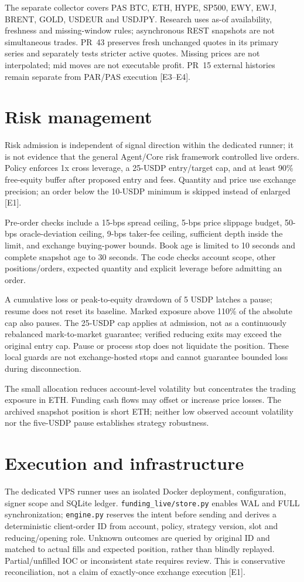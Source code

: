 \documentclass[a4paper]{article}
\begin{document}
The separate collector covers PAS BTC, ETH, HYPE, SP500, EWY, EWJ, BRENT, GOLD, USDEUR and USDJPY. Research uses as-of availability, freshness and missing-window rules; asynchronous REST snapshots are not simultaneous trades. PR~43 preserves fresh unchanged quotes in its primary series and separately tests stricter active quotes. Missing prices are not interpolated; mid moves are not executable profit. PR~15 external histories remain separate from PAR/PAS execution [E3--E4].

\section{Risk management}
Risk admission is independent of signal direction within the dedicated runner; it is not evidence that the general Agent/Core risk framework controlled live orders. Policy enforces 1x cross leverage, a 25-USDP entry/target cap, and at least 90\% free-equity buffer after proposed entry and fees. Quantity and price use exchange precision; an order below the 10-USDP minimum is skipped instead of enlarged [E1].

Pre-order checks include a 15-bps spread ceiling, 5-bps price slippage budget, 50-bps oracle-deviation ceiling, 9-bps taker-fee ceiling, sufficient depth inside the limit, and exchange buying-power bounds. Book age is limited to 10 seconds and complete snapshot age to 30 seconds. The code checks account scope, other positions/orders, expected quantity and explicit leverage before admitting an order.

A cumulative loss or peak-to-equity drawdown of 5 USDP latches a pause; resume does not reset its baseline. Marked exposure above 110\% of the absolute cap also pauses. The 25-USDP cap applies at admission, not as a continuously rebalanced mark-to-market guarantee; verified reducing exits may exceed the original entry cap. Pause or process stop does not liquidate the position. These local guards are not exchange-hosted stops and cannot guarantee bounded loss during disconnection.

The small allocation reduces account-level volatility but concentrates the trading exposure in ETH. Funding cash flows may offset or increase price losses. The archived snapshot position is short ETH; neither low observed account volatility nor the five-USDP pause establishes strategy robustness.

\section{Execution and infrastructure}
The dedicated VPS runner uses an isolated Docker deployment, configuration, signer scope and SQLite ledger. \texttt{funding\_live/store.py} enables WAL and FULL synchronization; \texttt{engine.py} reserves the intent before sending and derives a deterministic client-order ID from account, policy, strategy version, slot and reducing/opening role. Unknown outcomes are queried by original ID and matched to actual fills and expected position, rather than blindly replayed. Partial/unfilled IOC or inconsistent state requires review. This is conservative reconciliation, not a claim of exactly-once exchange execution [E1].
\end{document}
